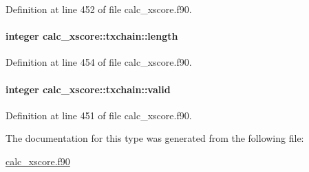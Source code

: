Definition at line 452 of file calc\-\_\-xscore.\-f90.

\hypertarget{structcalc__xscore_1_1txchain_a2c3d755716e8a35a0901f664c83cdeef}{
\paragraph[{length}]{\setlength{\rightskip}{0pt plus 5cm}integer calc\-\_\-xscore\-::txchain\-::length}}\label{structcalc__xscore_1_1txchain_a2c3d755716e8a35a0901f664c83cdeef}


Definition at line 454 of file calc\-\_\-xscore.\-f90.

\hypertarget{structcalc__xscore_1_1txchain_a5ceade9eb8de5cc9e210bb0257d126e4}{
\paragraph[{valid}]{\setlength{\rightskip}{0pt plus 5cm}integer calc\-\_\-xscore\-::txchain\-::valid}}\label{structcalc__xscore_1_1txchain_a5ceade9eb8de5cc9e210bb0257d126e4}


Definition at line 451 of file calc\-\_\-xscore.\-f90.



The documentation for this type was generated from the following file\-:\begin{DoxyCompactItemize}
\item 
\hyperlink{calc__xscore_8f90}{calc\-\_\-xscore.\-f90}\end{DoxyCompactItemize}
